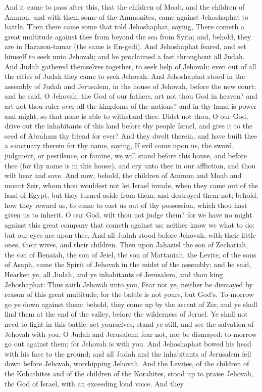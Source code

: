 And it came to pass after this, that the children of Moab, and the children of Ammon, and with them some of the Ammonites, came against Jehoshaphat to battle. Then there came some that told Jehoshaphat, saying, There cometh a great multitude against thee from beyond the sea from Syria; and, behold, they are in Hazazon-tamar (the same is En-gedi). And Jehoshaphat feared, and set himself to seek unto Jehovah; and he proclaimed a fast throughout all Judah. And Judah gathered themselves together, to seek help of Jehovah: even out of all the cities of Judah they came to seek Jehovah.  And Jehoshaphat stood in the assembly of Judah and Jerusalem, in the house of Jehovah, before the new court; and he said, O Jehovah, the God of our fathers, art not thou God in heaven? and art not thou ruler over all the kingdoms of the nations? and in thy hand is power and might, so that none is able to withstand thee. Didst not thou, O our God, drive out the inhabitants of this land before thy people Israel, and give it to the seed of Abraham thy friend for ever? And they dwelt therein, and have built thee a sanctuary therein for thy name, saying, If evil come upon us, the sword, judgment, or pestilence, or famine, we will stand before this house, and before thee (for thy name is in this house), and cry unto thee in our affliction, and thou wilt hear and save. And now, behold, the children of Ammon and Moab and mount Seir, whom thou wouldest not let Israel invade, when they came out of the land of Egypt, but they turned aside from them, and destroyed them not; behold, how they reward us, to come to cast us out of thy possession, which thou hast given us to inherit. O our God, wilt thou not judge them? for we have no might against this great company that cometh against us; neither know we what to do: but our eyes are upon thee. And all Judah stood before Jehovah, with their little ones, their wives, and their children.  Then upon Jahaziel the son of Zechariah, the son of Benaiah, the son of Jeiel, the son of Mattaniah, the Levite, of the sons of Asaph, came the Spirit of Jehovah in the midst of the assembly; and he said, Hearken ye, all Judah, and ye inhabitants of Jerusalem, and thou king Jehoshaphat: Thus saith Jehovah unto you, Fear not ye, neither be dismayed by reason of this great multitude; for the battle is not yours, but God’s. To-morrow go ye down against them: behold, they come up by the ascent of Ziz; and ye shall find them at the end of the valley, before the wilderness of Jeruel. Ye shall not need to fight in this battle: set yourselves, stand ye still, and see the salvation of Jehovah with you, O Judah and Jerusalem; fear not, nor be dismayed: to-morrow go out against them; for Jehovah is with you. And Jehoshaphat bowed his head with his face to the ground; and all Judah and the inhabitants of Jerusalem fell down before Jehovah, worshipping Jehovah. And the Levites, of the children of the Kohathites and of the children of the Korahites, stood up to praise Jehovah, the God of Israel, with an exceeding loud voice.  And they 